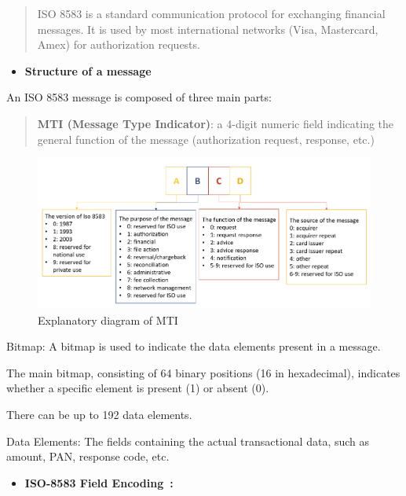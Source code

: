 \documentclass[12pt,a4paper]{report}
\begin{document}
\begin{quote}
ISO 8583 is a standard communication protocol for exchanging financial
messages. It is used by most international networks (Visa, Mastercard,
Amex) for authorization requests.
\end{quote}

\begin{itemize}
\item
  \textbf{Structure of a message}
\end{itemize}

An ISO 8583 message is composed of three main parts:

\begin{quote}
\textbf{MTI (Message Type Indicator)}: a 4-digit numeric field
indicating the general function of the message (authorization request,
response, etc.)
\end{quote}


\begin{figure}[H]
\centering
\includegraphics[width=6in]{media/image30.png}
\caption{Explanatory diagram of MTI }
\label{fig:hpsTraining}
\end{figure}

Bitmap: A bitmap is used to indicate the data elements present in a
message.

The main bitmap, consisting of 64 binary positions (16 in hexadecimal),
indicates whether a specific element is present (1) or absent (0).

There can be up to 192 data elements.

Data Elements: The fields containing the actual transactional data, such
as amount, PAN, response code, etc.

\begin{itemize}
\item
  \textbf{ISO-8583 Field Encoding~:}
\end{itemize}
\end{document}
